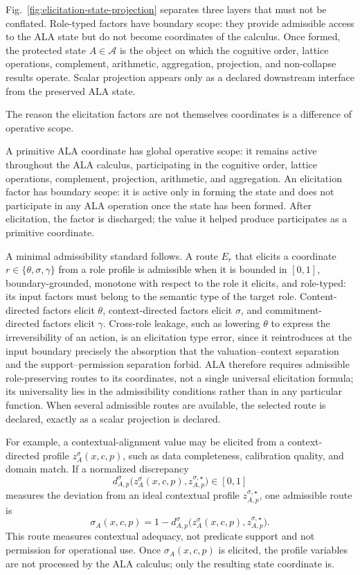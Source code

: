 \documentclass[reqno,final]{amsart}
\theoremstyle{definition}
\theoremstyle{plain}
\theoremstyle{remark}
\providecommand{\cA}{\mathcal{A}}
\begin{document}
Fig.~\ref{fig:elicitation-state-projection} separates three layers that must not be conflated. Role-typed factors have boundary scope: they provide admissible access to the ALA state but do not become coordinates of the calculus. Once formed, the protected state \(A\in\cA\) is the object on which the cognitive order, lattice operations, complement, arithmetic, aggregation, projection, and non-collapse results operate. Scalar projection appears only as a declared downstream interface from the preserved ALA state.

The reason the elicitation factors are not themselves coordinates is a difference of operative scope.

A primitive ALA coordinate has global operative scope: it remains active throughout the ALA calculus, participating in the cognitive order, lattice operations, complement, projection, arithmetic, and aggregation. An elicitation factor has boundary scope: it is active only in forming the state and does not participate in any ALA operation once the state has been formed. After elicitation, the factor is discharged; the value it helped produce participates as a primitive coordinate.

A minimal admissibility standard follows. A route \(E_r\) that elicits a coordinate \(r\in\{\theta,\sigma,\gamma\}\) from a role profile is admissible when it is bounded in \([0,1]\), boundary-grounded, monotone with respect to the role it elicits, and role-typed: its input factors must belong to the semantic type of the target role. Content-directed factors elicit \(\theta\), context-directed factors elicit \(\sigma\), and commitment-directed factors elicit \(\gamma\). Cross-role leakage, such as lowering \(\theta\) to express the irreversibility of an action, is an elicitation type error, since it reintroduces at the input boundary precisely the absorption that the valuation--context separation and the support--permission separation forbid. ALA therefore requires admissible role-preserving routes to its coordinates, not a single universal elicitation formula; its universality lies in the admissibility conditions rather than in any particular function. When several admissible routes are available, the selected route is declared, exactly as a scalar projection is declared.

For example, a contextual-alignment value may be elicited from a context-directed profile \(z_A^\sigma(x,c,p)\), such as data completeness, calibration quality, and domain match. If a normalized discrepancy
\[
d_{A,p}^{\sigma}
\bigl(z_A^{\sigma}(x,c,p),z_{A,p}^{\sigma,\star}\bigr)\in[0,1]
\]
measures the deviation from an ideal contextual profile \(z_{A,p}^{\sigma,\star}\), one admissible route is
\[
\sigma_A(x,c,p)
=
1-d_{A,p}^{\sigma}
\bigl(z_A^{\sigma}(x,c,p),z_{A,p}^{\sigma,\star}\bigr).
\]
This route measures contextual adequacy, not predicate support and not permission for operational use. Once \(\sigma_A(x,c,p)\) is elicited, the profile variables are not processed by the ALA calculus; only the resulting state coordinate is.
\end{document}
